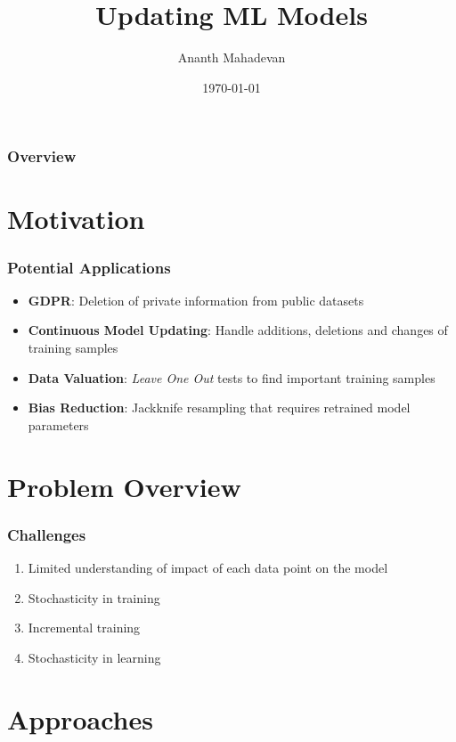 \documentclass[pdf]{beamer}
\title{Updating ML Models}
\author[Ananth Mahadevan]{Ananth Mahadevan}
\date{\today}
\begin{document}
\begin{frame}
    \titlepage
\end{frame}

\begin{frame}
    \frametitle{Overview}
    \tableofcontents
\end{frame}

\section{Motivation}
\begin{frame}
  \frametitle{Potential Applications}
  \begin{itemize}
    \item<1-> \textbf{GDPR}: Deletion of private information from public datasets
    \item<2-> \textbf{Continuous Model Updating}: Handle additions, deletions and changes of training samples
    \item<3-> \textbf{Data Valuation}: \textit{Leave One Out} tests to find important training samples 
    \item<4-> \textbf{Bias Reduction}: Jackknife resampling that requires retrained model parameters 
  \end{itemize}

\end{frame}

\section{Problem Overview}

\begin{frame}
  \frametitle{Challenges \cite{bourtouleMachineUnlearning2020}}
  \begin{enumerate}
    \item Limited understanding of impact of each data point on the model
    \item Stochasticity in training 
    \item Incremental training 
    \item Stochasticity in learning 
  \end{enumerate}
  

\end{frame}
\section{Approaches}
\begin{frame}
  \frametitle{}
  \myNset[6]
  \smartart
\end{frame}
\end{document}
